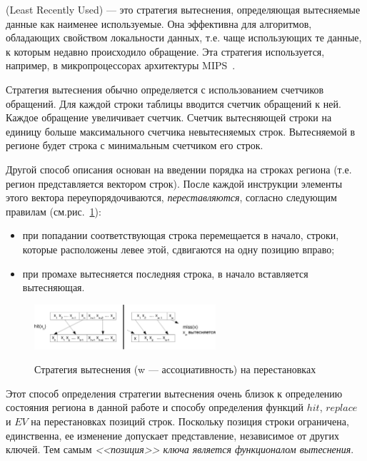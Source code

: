 \LRU (Least Recently Used) --- это стратегия вытеснения,
определяющая вытесняемые данные как наименее используемые. Она
эффективна для алгоритмов, обладающих свойством локальности данных,
т.е. чаще использующих те данные, к которым недавно происходило
обращение. Эта стратегия используется, например, в микропроцессорах
архитектуры MIPS~\cite{mips64II}.

Стратегия вытеснения \LRU обычно определяется с использованием
счетчиков обращений. Для каждой строки таблицы
вводится счетчик обращений к ней. Каждое обращение увеличивает
счетчик. Счетчик вытесняющей строки на единицу больше максимального счетчика невытесняемых строк. Вытесняемой в регионе будет строка с минимальным счетчиком его строк.

Другой способ описания \LRU основан на введении порядка на строках региона (т.е.
регион представляется вектором строк). После каждой инструкции элементы этого вектора переупорядочиваются, \emph{переставляются}, согласно следующим правилам (см.рис.~\ref{fig:lru1}):
\begin{itemize}
\item при попадании соответствующая строка перемещается в начало, строки, которые расположены левее этой, сдвигаются на одну позицию вправо;
\item при промахе вытесняется последняя строка, в начало вставляется вытесняющая.
\end{itemize}

\begin{figure}[h] \center
  \includegraphics[width=0.6\textwidth]{2.theor/lru1}\\
  \caption{Стратегия вытеснения \LRU (w --- ассоциативность) на
перестановках}\label{fig:lru1}
\end{figure}

Этот способ определения стратегии вытеснения \LRU очень близок к определению состояния региона в данной работе и способу определения функций $hit$, $replace$ и $EV$ на перестановках позиций строк. Поскольку позиция строки ограничена, единственна, ее изменение допускает представление, независимое от других ключей. Тем самым \emph{<<позиция>> ключа является функционалом вытеснения}.

